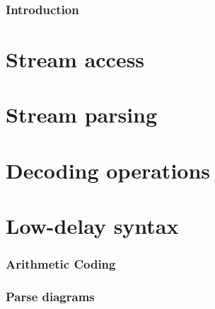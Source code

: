 
\section{Introduction}


\clearpage
\part{Stream access}\label{streamaccess}
\clearpage
\part{Stream parsing}\label{streamparsing}
\clearpage
\part{Decoding operations}\label{decodingops}
\clearpage
\part{Low-delay syntax}




\appendix
\clearpage
\section{Arithmetic Coding}

\clearpage
\section{Parse diagrams}

